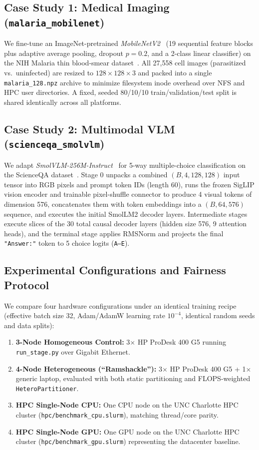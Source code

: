 \documentclass[conference]{IEEEtran}
\begin{document}
\subsection{Case Study 1: Medical Imaging (\texttt{malaria\_mobilenet})}
We fine-tune an ImageNet-pretrained \textit{MobileNetV2}~\cite{mobilenetv2_2018} (19 sequential feature blocks plus adaptive average pooling, dropout $p=0.2$, and a 2-class linear classifier) on the NIH Malaria thin blood-smear dataset~\cite{nih_malaria2018}. All 27,558 cell images (parasitized vs.\ uninfected) are resized to $128 \times 128 \times 3$ and packed into a single \texttt{malaria\_128.npz} archive to minimize filesystem inode overhead over NFS and HPC user directories. A fixed, seeded 80/10/10 train/validation/test split is shared identically across all platforms.

\subsection{Case Study 2: Multimodal VLM (\texttt{scienceqa\_smolvlm})}
We adapt \textit{SmolVLM-256M-Instruct}~\cite{smolvlm2025} for 5-way multiple-choice classification on the ScienceQA dataset~\cite{scienceqa2022}. Stage 0 unpacks a combined $(B, 4, 128, 128)$ input tensor into RGB pixels and prompt token IDs (length 60), runs the frozen SigLIP vision encoder and trainable pixel-shuffle connector to produce 4 visual tokens of dimension 576, concatenates them with token embeddings into a $(B, 64, 576)$ sequence, and executes the initial SmolLM2 decoder layers. Intermediate stages execute slices of the 30 total causal decoder layers (hidden size 576, 9 attention heads), and the terminal stage applies RMSNorm and projects the final \texttt{"Answer:"} token to 5 choice logits (\texttt{A--E}).

\subsection{Experimental Configurations and Fairness Protocol}
We compare four hardware configurations under an identical training recipe (effective batch size 32, Adam/AdamW learning rate $10^{-4}$, identical random seeds and data splits):
\begin{enumerate}
    \item \textbf{3-Node Homogeneous Control:} 3$\times$ HP ProDesk 400 G5 running \texttt{run\_stage.py} over Gigabit Ethernet.
    \item \textbf{4-Node Heterogeneous (``Ramshackle''):} 3$\times$ HP ProDesk 400 G5 + 1$\times$ generic laptop, evaluated with both static partitioning and FLOPS-weighted \texttt{HeteroPartitioner}.
    \item \textbf{HPC Single-Node CPU:} One CPU node on the UNC Charlotte HPC cluster (\texttt{hpc/benchmark\_cpu.slurm}), matching thread/core parity.
    \item \textbf{HPC Single-Node GPU:} One GPU node on the UNC Charlotte HPC cluster (\texttt{hpc/benchmark\_gpu.slurm}) representing the datacenter baseline.
\end{enumerate}
\end{document}

